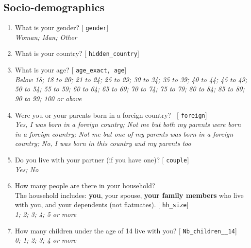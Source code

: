  \subsection*{Socio-demographics} 
 \begin{enumerate}[resume] 
\item  \label{q:gender} What is your gender? [%
\verb|gender|]
  \\ \textit{Woman; Man; Other}

\item  \label{q:hidden_country} What is your country? [%
\verb|hidden_country|]


\item  \label{q:age_exact} What is your age? [%
\verb|age_exact, age|]
  \\ \textit{Below 18; 18 to 20; 21 to 24; 25 to 29; 30 to 34; 35 to 39; 40 to 44; 45 to 49; 50 to 54; 55 to 59; 60 to 64; 65 to 69; 70 to 74; 75 to 79; 80 to 84; 85 to 89; 90 to 99; 100 or above}

\item  \label{q:foreign} Were you or your parents born in a foreign country?~ [%
\verb|foreign|]
  \\ \textit{Yes, I was born in a foreign country; Not me but both my parents were born in a foreign country; Not me but one of my parents was born in a foreign country; No, I was born in this country and my parents too}

\item  \label{q:couple} Do you live with your partner (if you have one)? [%
\verb|couple|]
  \\ \textit{Yes; No}

\item  \label{q:hh_size} How many people are there in your household? \\The household includes: \textbf{you}, your spouse, \textbf{your family members} who live with you, and your dependents (not flatmates). [%
\verb|hh_size|]
  \\ \textit{1; 2; 3; 4; 5 or more}

\item  \label{q:Nb_children__14} How many children under the age of 14 live with you? [%
\verb|Nb_children__14|]
  \\ \textit{0; 1; 2; 3; 4 or more}


\end{enumerate}
